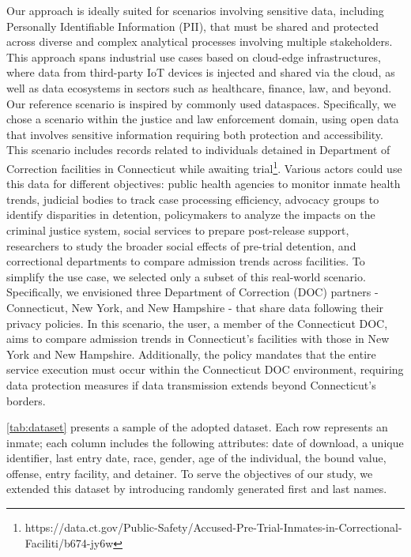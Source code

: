 {\color{OurColor}Our approach is ideally suited for scenarios involving sensitive data, including Personally Identifiable Information (PII), that must be shared and protected across diverse and complex analytical processes involving multiple stakeholders. This approach spans industrial use cases based on cloud-edge infrastructures, where data from third-party IoT devices is injected and shared via the cloud, as well as data ecosystems in sectors such as healthcare, finance, law, and beyond.
Our reference scenario is inspired by commonly used dataspaces. Specifically, we chose a scenario within the justice and law enforcement domain, using open data that involves sensitive information requiring both protection and accessibility. This scenario includes records related to individuals detained in Department of Correction facilities in Connecticut while awaiting trial\footnote{https://data.ct.gov/Public-Safety/Accused-Pre-Trial-Inmates-in-Correctional-Faciliti/b674-jy6w}. Various actors could use this data for different objectives: public health agencies to monitor inmate health trends, judicial bodies to track case processing efficiency, advocacy groups to identify disparities in detention, policymakers to analyze the impacts on the criminal justice system, social services to prepare post-release support, researchers to study the broader social effects of pre-trial detention, and correctional departments to compare admission trends across facilities.
To simplify the use case, we selected only a subset of this real-world scenario. Specifically, we envisioned three Department of Correction (DOC) partners - Connecticut, New York, and New Hampshire - that share data following their privacy policies. In this scenario, the user, a member of the Connecticut DOC, aims to compare admission trends in Connecticut’s facilities with those in New York and New Hampshire. Additionally, the policy mandates that the entire service execution must occur within the Connecticut DOC environment, requiring data protection measures if data transmission extends beyond Connecticut’s borders.}

\cref{tab:dataset} presents a sample of the adopted dataset. Each row represents an inmate; each column includes the following attributes: date of download, a unique identifier, last entry date, race, gender, age of the individual, the bound value, offense, entry facility, and detainer. To serve the objectives of our study, we extended this dataset by introducing randomly generated first and last names.


